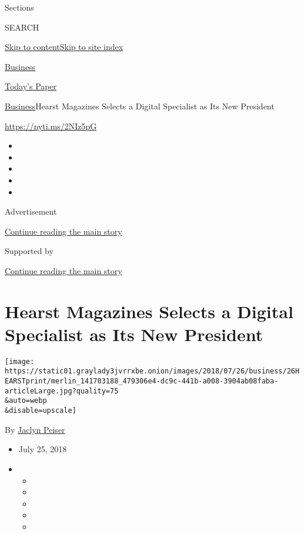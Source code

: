 Sections

SEARCH

\protect\hyperlink{site-content}{Skip to
content}\protect\hyperlink{site-index}{Skip to site index}

\href{https://www.nytimes3xbfgragh.onion/section/business}{Business}

\href{https://myaccount.nytimes3xbfgragh.onion/auth/login?response_type=cookie\&client_id=vi}{}

\href{https://www.nytimes3xbfgragh.onion/section/todayspaper}{Today's
Paper}

\href{/section/business}{Business}\textbar{}Hearst Magazines Selects a
Digital Specialist as Its New President

\url{https://nyti.ms/2NIz5pG}

\begin{itemize}
\item
\item
\item
\item
\item
\end{itemize}

Advertisement

\protect\hyperlink{after-top}{Continue reading the main story}

Supported by

\protect\hyperlink{after-sponsor}{Continue reading the main story}

\hypertarget{hearst-magazines-selects-a-digital-specialist-as-its-new-president}{%
\section{Hearst Magazines Selects a Digital Specialist as Its New
President}\label{hearst-magazines-selects-a-digital-specialist-as-its-new-president}}

\texttt{[image: https://static01.graylady3jvrrxbe.onion/images/2018/07/26/business/26HEARSTprint/merlin\_141703188\_479306e4-dc9c-441b-a008-3904ab08faba-articleLarge.jpg?quality=75\\\&auto=webp\\\&disable=upscale]}

By \href{https://www.nytimes3xbfgragh.onion/by/jaclyn-peiser}{Jaclyn
Peiser}

\begin{itemize}
\item
  July 25, 2018
\item
  \begin{itemize}
  \item
  \item
  \item
  \item
  \item
  \end{itemize}
\end{itemize}

